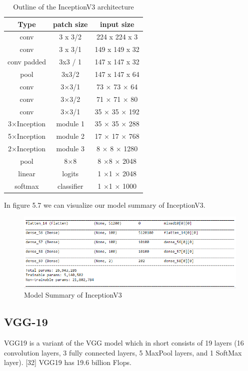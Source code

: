 \begin{table}[hbt!]
\centering
\begin{tabular}{|c | c | c|}
\hline
Type & patch size & input size\\
\hline
conv & 3 x 3/2 & 224 x 224 x 3\\
\hline
conv & 3 x 3/1 & 149 x 149 x 32\\
\hline
conv padded & 3x3 / 1 & 147 x 147 x 32\\
\hline
pool & 3x3/2 & 147 x 147 x 64\\
\hline
conv & 3×3/1 & 73 × 73 × 64\\
\hline
conv & 3×3/2 & 71 × 71 × 80\\
\hline
conv & 3×3/1 & 35 × 35 × 192\\
\hline
3×Inception & module 1 & 35 × 35 × 288\\
\hline
5×Inception & module 2 & 17 × 17 × 768\\
\hline
2×Inception & module 3 & 8 × 8 × 1280\\
\hline
pool & 8×8 & 8 ×8 × 2048\\
\hline
linear & logits & 1 ×1 × 2048\\
\hline
softmax & classifier & 1 ×1 × 1000\\
\hline

\end{tabular}
\caption{Outline of the InceptionV3 architecture}
\label{tab:Outline of the InceptionV3 architecture [31]
)}
\end{table}

In figure 5.7 we can visualize our model summary of InceptionV3.

\vspace{5mm}
\begin{figure}[hbt!]
\centering
\includegraphics[scale=0.75]{images/fig-11.png}
\caption{Model Summary of InceptionV3}
\label{fig:x Model Summary of InceptionV3}
\end{figure}

\subsection{VGG-19}
VGG19 is a variant of the VGG model which in short consists of 19 layers (16 convolution layers, 3 fully connected layers, 5 MaxPool layers, and 1 SoftMax layer). [32] VGG19 has 19.6 billion Flops.

